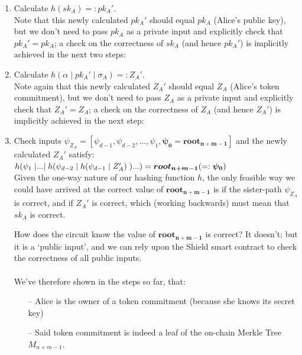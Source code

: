 \documentclass{article}
\DeclarePairedDelimiter\br{(}{)}
\begin{document}
\begin{enumerate}
  \item Calculate $h(sk_A) =: pk_A'$.\\
    Note that this newly calculated $pk_A'$ should equal $pk_A$ (Alice's public key), but we don't need to pass $pk_A$ as a private input and explicitly check that $pk_A'=pk_A$; a check on the correctness of $sk_A$ (and hence $pk_A'$) is implicitly achieved in the next two steps:
  \item Calculate $h(\alpha\;|\;pk_A'\;|\;\sigma_A) =: Z_A'$.\\
    Note again that this newly calculated $Z_A'$ should equal $Z_A$ (Alice's token commitment), but we don't need to pass $Z_A$ as a private input and explicitly check that $Z_A'=Z_A$; a check on the correctness of $Z_A$ (and hence $Z_A'$) is implicitly achieved in the next step:
  \item Check inputs $\psi_{Z_A}=[\psi_{d-1}, \psi_{d-2},..., \psi_{1}, \bm{\psi_{0}=root_{n+m-1}}]$ and the newly calculated $Z_A'$ satisfy:\\
    $h\br*{\psi_{1}\;|...|\;h\br*{\psi_{d-2}\;|\;h\br*{\psi_{d-1}\;|\;Z_A'}\;}...} = \bm{root_{n+m-1}} ( =: \bm{\psi_{0}})$\\
    Given the one-way nature of our hashing function $h$, the only feasible way we could have arrived at the correct value of $\bm{root_{n+m-1}}$ is if the sister-path $\psi_{Z_A}$ is correct, and if $Z_A'$ is correct, which (working backwards) must mean that $sk_A$ is correct.

    How does the circuit know the value of $\bm{root_{n+m-1}}$ is correct? It doesn't; but it is a `public input', and we can rely upon the Shield smart contract to check the correctness of all public inputs.\\
  \\
  We've therefore shown in the steps so far, that:
  \begin{itemize}
    \item[--] Alice is the owner of a token commitment (because she knows its secret key)
    \item[--] Said token commitment is indeed a leaf of the on-chain Merkle Tree $M_{n+m-1}$.
  \end{itemize}


\end{enumerate}
\end{document}
